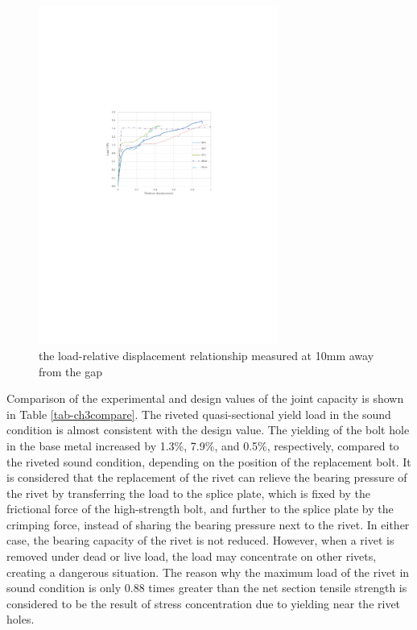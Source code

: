\begin{figure}[htbp]
    \centering
    \includegraphics[width=0.7\textwidth]{imgs/ch3/fig3-15.pdf}
    \caption{the load-relative displacement relationship measured at 10mm away from the gap}
    \label{fig3-15}
\end{figure}


Comparison of the experimental and design values of the joint capacity is shown in Table \ref{tab-ch3compare}. The riveted quasi-sectional yield load in the sound condition is almost consistent with the design value. The yielding of the bolt hole in the base metal increased by 1.3\%, 7.9\%, and 0.5\%, respectively, compared to the riveted sound condition, depending on the position of the replacement bolt. It is considered that the replacement of the rivet can relieve the bearing pressure of the rivet by transferring the load to the splice plate, which is fixed by the frictional force of the high-strength bolt, and further to the splice plate by the crimping force, instead of sharing the bearing pressure next to the rivet. In either case, the bearing capacity of the rivet is not reduced. However, when a rivet is removed under dead or live load, the load may concentrate on other rivets, creating a dangerous situation. The reason why the maximum load of the rivet in sound condition is only 0.88 times greater than the net section tensile strength is considered to be the result of stress concentration due to yielding near the rivet holes.

